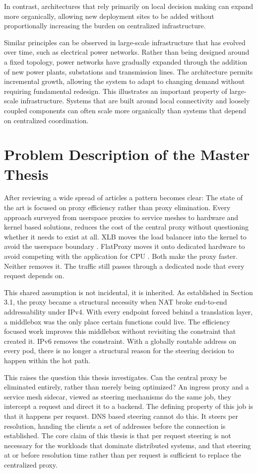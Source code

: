 \documentclass[a4paper,11pt]{article}
\begin{document}
In contrast, architectures that rely primarily on
local decision making can expand more organically, allowing new deployment sites to be added without
proportionally increasing the burden on centralized infrastructure.

Similar principles can be observed in large-scale infrastructure that has evolved over time, 
such as electrical power networks. Rather than being designed around a fixed topology,
power networks have gradually expanded through the addition of new power plants,
substations and transmission lines. The architecture permits incremental growth, 
allowing the system to adapt to changing demand without requiring fundamental redesign. 
This illustrates an important property of large-scale infrastructure. 
Systems that are built around local connectivity and loosely coupled components can often 
scale more organically than systems that depend on centralized coordination.


\section{Problem Description of the Master Thesis}
After reviewing a wide spread of articles a pattern becomes clear: The state of the 
art is focused on proxy efficiency rather than proxy elimination. Every approach surveyed
from userspace proxies to service meshes to hardware and kernel based solutions, reduces the cost of
the central proxy without questioning whether it needs to exist at all. XLB moves the load balancer into the kernel
to avoid the userspace boundary \cite{wangXLBHighPerformance2026}. FlatProxy moves it onto dedicated hardware
to avoid competing with the application for CPU \cite{liFlatProxyDPUcentricService2023}.
Both make the proxy faster. Neither removes it. The traffic still passes through a dedicated
node that every request depends on.

This shared assumption is not incidental, it is inherited. As established in Section 3.1, the
proxy became a structural necessity when NAT broke end-to-end addressability under IPv4.
With every endpoint forced behind a translation layer, a middlebox was the only place certain functions could live.
The efficiency focused work improves this middlebox without revisiting the constraint that created it.
IPv6 removes the constraint. With a globally routable address on every pod, there is no longer a structural reason
for the steering decision to happen within the hot path.

This raises the question this thesis investigates. Can the central proxy be eliminated entirely,
rather than merely being optimized? An ingress proxy and a service mesh sidecar, viewed as steering mechanisms do the same job,
they intercept a request and direct it to a backend. The defining property of this job is that it happens per request.
DNS based steering cannot do this. It steers per resolution, handing the clients a set of addresses before the connection is established.
The core claim of this thesis is that per request steering is not necessary for the workloads that dominate distributed systems,
and that steering at or before resolution time rather than per request is sufficient to replace the centralized proxy.
\end{document}
